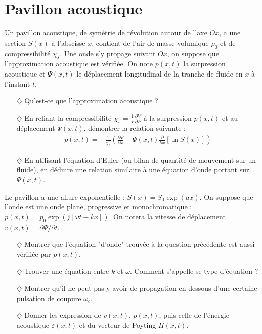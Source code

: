 \documentclass{report}
\begin{document}
\newpage

\section*{Pavillon acoustique}

Un pavillon acoustique, de symétrie de révolution autour de l'axe $Ox$, a une section $S(x)$ à l'abscisse $x$, contient de l'air de masse volumique $\rho_0$ et de compressibilité $\chi_s$. Une onde s'y propage suivant $Ox$, on suppose que l'approximation acoustique est vérifiée. On note $p(x,t)$ la surpression acoustique et $\Psi(x,t)$ le déplacement longitudinal de la tranche de fluide en $x$ à l'instant $t$. 

\begin{itemize}

\item[$\diamondsuit$] Qu'est-ce que l'approximation acoustique ?

\item[$\diamondsuit$] En reliant la compressibilité $\chi_s=\frac{1}{V}\frac{\partial V}{\partial P}$ à la surpression $p(x,t)$ et au déplacement $\Psi(x,t)$, démontrer la relation suivante :
\begin{align*}
	p(x,t) = -\frac{1}{\chi_s}\left(\frac{\partial \Psi}{\partial x}+\Psi(x,t)\frac{\partial }{\partial x}\left[\ln S(x) \right]  \right)
\end{align*}

\item[$\diamondsuit$] En utilisant l'équation d'Euler (ou bilan de quantité de mouvement sur un fluide), en déduire une relation similaire à une équation d'onde portant sur $\Psi(x,t)$.

\end{itemize}

Le pavillon a une allure exponentielle : $S(x)=S_0\exp(ax)$. On suppose que l'onde est une onde plane, progressive et monochromatique : $p(x,t)=p_0\exp\left(j[\omega t-kx] \right)$. On notera la vitesse de déplacement $v(x,t)=\partial\Psi/\partial t$.

\begin{itemize}

\item[$\diamondsuit$] Montrer que l'équation "d'onde" trouvée à la question précédente est aussi vérifiée par $p(x,t)$.

\item[$\diamondsuit$]  Trouver une équation entre $k$ et $\omega$. Comment s'appelle se type d'équation ?

\item[$\diamondsuit$] Montrer qu'il ne peut pas y avoir de propagation en dessous d'une certaine pulsation de coupure $\omega_c$.

\item[$\diamondsuit$] Donner les expression de $v(x,t)$, $p(x,t)$, puis celle de l'énergie acoustique $\varepsilon(x,t)$ et du vecteur de Poyting $\Pi(x,t)$.

\end{itemize}
\end{document}
